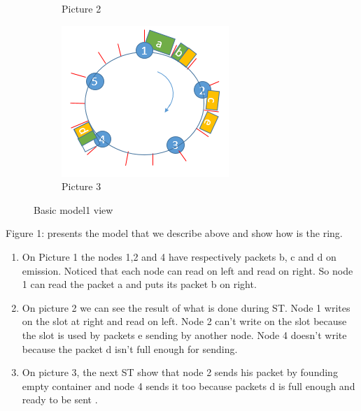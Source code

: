 \documentclass{article}
\begin{document}
\begin{figure}[h!]
\begin{subfigure}[b]{0.5\textwidth}
    \caption{Picture 2}
    \label{fig:2}
  \end{subfigure}
%
  \begin{subfigure}[b]{0.5\textwidth}
    \includegraphics[width=\textwidth]{etape3.PNG}
    \caption{Picture 3}
    \label{fig:3}
  \end{subfigure}
\caption{Basic model1 view}
\end{figure}

\newpage
Figure 1: presents the model that we describe above and show how is the ring.
\begin{enumerate}[label=$\bullet$]
\item On Picture 1 the nodes 1,2 and 4 have respectively packets b, c and d on emission. Noticed that each node can read on left and read on right. So node 1 can read the packet a and puts its packet b on right.   
\item On picture 2 we can see the result of what is done during ST. Node 1 writes  on the slot at right and read on left. Node 2 can't write on the slot because the slot is used by packets e sending by another node. Node 4 doesn't write because the packet d isn't full enough for sending.
\item On picture 3, the next ST show that node 2 sends his packet by founding empty container and node 4 sends it too because packets d is full enough and ready to be sent .
\end{enumerate}
\end{document}
